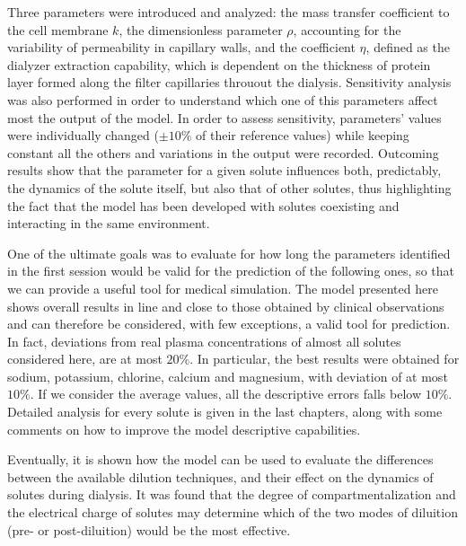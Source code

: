 Three parameters were introduced and analyzed: the mass transfer coefficient to the cell membrane $k$, the dimensionless parameter $\rho$, accounting for the variability  of permeability in capillary walls, and the coefficient $\eta$, defined as the dialyzer extraction capability, which is dependent on the thickness of protein layer formed along the filter capillaries throuout the dialysis. Sensitivity analysis was also performed in order to understand which one of this parameters affect most the output of the model. In order to assess sensitivity, parameters' values were individually changed ($\pm 10\%$ of their reference values) while keeping constant all the others and variations in the output were recorded. Outcoming results show that the parameter for a given solute influences both, predictably, the dynamics of the solute itself, but also that of other solutes, thus highlighting the fact that the model has been developed with solutes coexisting and interacting in the same environment.

One of the ultimate goals was to evaluate  for how long the parameters identified in the first session would be valid for the prediction of the following ones, so that we can provide a useful tool for medical simulation. The model presented here shows overall results in line and close to those obtained by clinical observations and can therefore be considered, with few exceptions, a valid tool for prediction. In fact, deviations from real plasma concentrations of almost all solutes considered here, are at most $20\%$. In particular, the best results were obtained for sodium, potassium, chlorine, calcium and magnesium, with deviation of at most $10\%$. If we consider the average values, all the descriptive errors falls below $10\%$. Detailed analysis for every solute is given in the last chapters, along with some comments on how to improve the model descriptive capabilities.

Eventually, it is shown how the model can be used to evaluate the differences between the available dilution techniques, and their effect on the dynamics of solutes during dialysis. It was found that the degree of compartmentalization and the electrical charge of solutes may determine which of the two modes of diluition (pre- or post-diluition) would be the most effective.